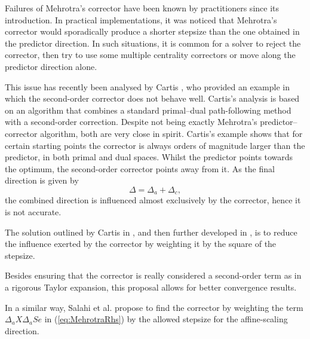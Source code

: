 Failures of Mehrotra's corrector have been known by practitioners 
since its introduction. In practical implementations, it was noticed 
that Mehrotra's corrector would sporadically produce a shorter stepsize 
than the one obtained in the predictor direction. 
In such situations, it is common for a solver
to reject the corrector, then try to use some multiple centrality 
correctors or move along the predictor direction alone.


This issue has recently been analysed by Cartis \cite{Cartis04}, 
who provided an example in which the second-order corrector does 
not behave well. Cartis's analysis is based on an algorithm 
that combines a standard primal--dual path-following method with 
a second-order correction. Despite not being exactly Mehrotra's 
predictor--corrector algorithm, both are very close in spirit.
Cartis's example shows that for certain starting points the corrector 
is always orders of magnitude larger than the predictor, in both 
primal and dual spaces. Whilst the predictor points towards 
the optimum, the second-order corrector points away from it.
As the final direction is given by
\[
\Delta = \Delta_{a} +\Delta_c,
\]
the combined direction is influenced almost exclusively by the corrector, 
hence it is not accurate. 


The solution outlined by Cartis in \cite{Cartis04}, and then further 
developed in \cite{Cartis05}, is to reduce the influence exerted by 
the corrector by weighting it by the square of the stepsize. 

Besides ensuring that the corrector is really considered 
a second-order term as in a rigorous Taylor expansion, 
this proposal allows for better convergence results.


In a similar way, Salahi et al. \cite{SalahiPengTerlaky} propose to find 
the corrector by weighting the term $\Delta_a X \Delta_a S e$ in 
(\ref{eq:MehrotraRhs}) by the allowed stepsize for the affine-scaling 
direction.

